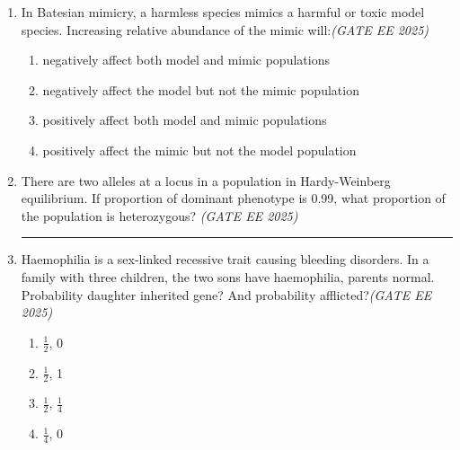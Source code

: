 \begin{enumerate}[leftmargin=*,label=\textbf{Q.\arabic*},resume]
\item In Batesian mimicry, a harmless species mimics a harmful or toxic model species. Increasing relative abundance of the mimic will:\hfill \textit{(GATE EE 2025)}
\begin{multicols}{2}
\begin{enumerate}[label=(\Alph*)]
\item negatively affect both model and mimic populations
\item negatively affect the model but not the mimic population
\item positively affect both model and mimic populations
\item positively affect the mimic but not the model population
\end{enumerate}
\end{multicols}

\item There are two alleles at a locus in a population in Hardy-Weinberg equilibrium. If proportion of dominant phenotype is 0.99, what proportion of the population is heterozygous?
\hfill \textit{(GATE EE 2025)}
\rule{4cm}{0.15mm}

\item Haemophilia is a sex-linked recessive trait causing bleeding disorders. In a family with three children, the two sons have haemophilia, parents normal. Probability daughter inherited gene? And probability afflicted?\hfill \textit{(GATE EE 2025)}
\begin{multicols}{2}
\begin{enumerate}[label=(\Alph*)]
\item $\frac{1}{2}$, 0
\item $\frac{1}{2}$, 1
\item $\frac{1}{2}$, $\frac{1}{4}$
\item $\frac{1}{4}$, 0
\end{enumerate}
\end{multicols}

\end{enumerate}

